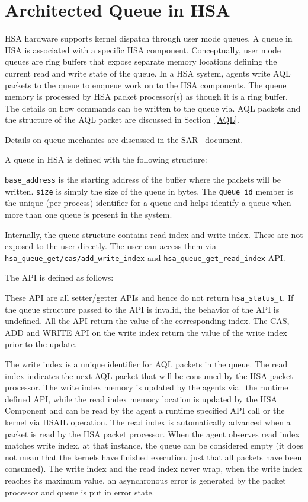 \hypertarget{architected\_queue}{} \section{Architected Queue in
H\-S\-A} \label{architected_queue}

H\-S\-A hardware supports kernel dispatch through user mode queues.
A queue in HSA is associated with a specific HSA component. 
Conceptually, user mode queues are ring buffers that expose separate
memory locations defining the current read and write state of the
queue. In a HSA system, agents write AQL packets to the queue to
enqueue work on to the HSA components. The queue memory is processed
by HSA packet processor(s) as though it is a ring buffer. The
details on how commands can be written to the queue via. AQL packets
and the structure of the AQL packet are discussed in
Section~\ref{AQL}.

Details on queue mechanics are discussed in the SAR~\cite{sar}
document. 

A queue in HSA is defined with the following structure:



\texttt{base\_address} is the starting address of the buffer where
the packets will be written.  \texttt{size} is simply the size of
the queue in bytes.  The \texttt{queue\-\_\-id} member is the unique
(per-process) identifier for a queue and helps identify a queue when
more than one queue is present in the system.

Internally, the queue structure contains read index and write
index. These are not exposed to the user directly. The user can
access them via \texttt{hsa\_queue\_get/cas/add\_write\_index} and
\texttt{hsa\_queue\_get\_read\_index} API.   

The API is defined as follows:



These API are all setter/getter APIs and hence do not return
\texttt{hsa\_status\_t}. If the queue structure passed to the API is
invalid, the behavior of the API is undefined. All the API return
the value of the corresponding index. The CAS, ADD and WRITE API on
the write index return the value of the write index prior to the
update.

The write index is a unique identifier for AQL packets in the
queue. The read index indicates the next AQL packet that will be
consumed by the HSA packet processor.  The write index 
memory is updated by the agents via.\ the runtime defined 
API, while the read index memory location is updated by
the H\-S\-A Component and can be read by the agent 
a runtime specified API call or the kernel via HSAIL operation.
The read index is automatically advanced when a packet is
read by the HSA packet processor.  When the agent observes read
index matches write index, at that instance, the queue can be
considered empty (it does not mean that the kernels have finished
execution, just that all packets have been consumed). The write
index and the read index never wrap, when the write index reaches
its maximum value, an asynchronous error is generated by the packet
processor and queue is put in error state.

